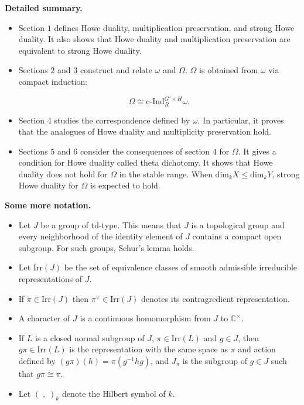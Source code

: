 \documentclass[12pt]{article}
\begin{document}
\textbf{Detailed summary.}

\begin{itemize}
    
\item Section $1$ defines Howe duality, multiplication preservation, and strong
Howe duality. It also shows that Howe duality and multiplication preservation
are equivalent to strong Howe duality.

\item Sections $2$ and $3$ construct and relate $\omega$ and $\Omega$. $\Omega$
is obtained from $\omega$ via compact induction: 

\[\Omega \cong \text{c-Ind}_{R}^{G' \times H} \omega.\]

\item Section 4 studies the correspondence defined by $\omega$. In particular,
it proves that the analogues of Howe duality and multiplicity preservation hold.

\item Sections $5$ and $6$ consider the consequences of section $4$ for
$\Omega$. It gives a condition for Howe duality called theta dichotomy. It shows
that Howe duality does not hold for $\Omega$ in the stable range. When
$\text{dim}_{k} X \leq \text{dim}_{k} Y$, strong Howe duality for $\Omega$ is
expected to hold.

\end{itemize}

\textbf{Some more notation.}


\begin{itemize}
    
\item Let $J$ be a group of td-type. This means that $J$ is a topological group
and every neighborhood of the identity element of $J$ contains a compact open
subgroup. For such groups, Schur's lemma holds.

\item Let $\text{Irr}\left(J\right)$ be the set of equivalence classes of smooth
admissible irreducible representations of $J$.

\item If $\pi \in \text{Irr}\left(J\right)$ then $\pi^{\vee} \in
\text{Irr}\left(J\right)$ denotes its contragredient representation.

\item A character of $J$ is a continuous homomorphism from $J$ to
$\mathbb{C}^{\times}$.

\item If $L$ is a closed normal subgroup of $J$, $\pi \in
\text{Irr}\left(L\right)$ and $g \in J$, then $g \pi \in
\text{Irr}\left(L\right)$ is the representation with the same space as $\pi$ and
action defined by $\left(g \pi\right)\left(h\right) = \pi\left(g^{-1}hg\right)$,
and $J_{\pi}$ is the subgroup of $g \in J$ such that $g \pi \cong \pi$.

\item Let $\left(\;,\;\right)_{k}$ denote the Hilbert symbol of $k$.

\end{itemize}
\end{document}
